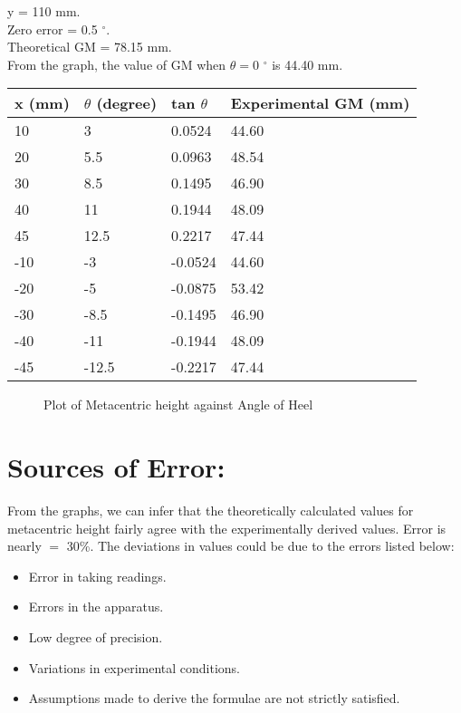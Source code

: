 \documentclass[12pt,a4paper]{article}
\begin{document}
\begin{itemize}
y = 110 mm.\\
Zero error = 0.5  $^{\circ}$. \\
Theoretical GM = 78.15 mm.\\
From the graph, the value of GM when $\theta = $0  $^{\circ}$ is 44.40 mm.\\
\begin{table}[!ht]
\begin{center}
\begin{tabular}{|p{2cm}|p{2cm}|p{2cm}|p{6cm}|}
\hline
x (mm) & $\theta$ (degree) & tan $\theta$ & Experimental GM (mm) \\
\hline
10 & 3 & 0.0524 & 44.60\\
20 & 5.5 & 0.0963 & 48.54\\
30 & 8.5 & 0.1495 & 46.90\\
40 & 11 & 0.1944 & 48.09\\
45 & 12.5 & 0.2217 & 47.44\\
-10 & -3 & -0.0524 & 44.60\\
-20 & -5 & -0.0875 & 53.42\\
-30 & -8.5 & -0.1495 & 46.90\\
-40 & -11 & -0.1944 & 48.09\\
-45 & -12.5 & -0.2217 & 47.44\\
\hline
\end{tabular}
\end{center}
\end{table}
\newpage
\begin{figure}[!ht]
	\begin{center}
	\end{center}
	\caption{Plot of Metacentric height against Angle of Heel}
\end{figure}
\end{itemize}
\section{Sources of Error:}
From the graphs, we can infer that the theoretically calculated values for metacentric height fairly agree with the experimentally derived values. Error is nearly $=$ 30\%.
The deviations in values could be due to the errors listed below:
\begin{itemize}
\item Error in taking readings.
\item Errors in the apparatus.
\item Low degree of precision.
\item Variations in experimental conditions.
\item Assumptions made to derive the formulae are not strictly satisfied.
\end{itemize}
\end{document}
